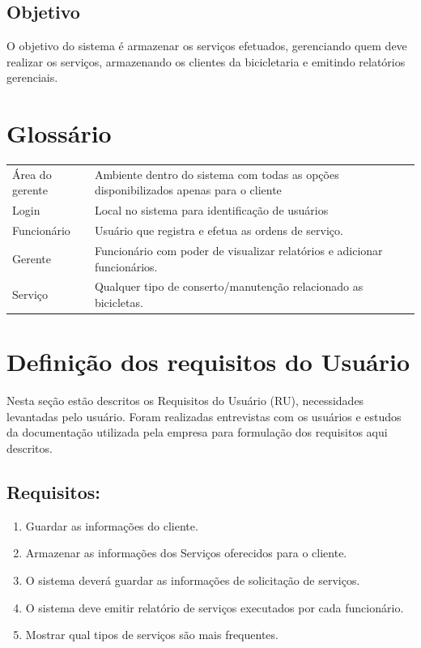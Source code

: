\documentclass[
	12pt,				%
	openright,
	oneside,			%
	a4paper,			%
	chapter=TITLE,		%
	brazil				%
	]{abntex2}
\begin{document}
\section{Objetivo}

O objetivo do sistema é armazenar os serviços efetuados, gerenciando quem deve realizar os serviços, armazenando os clientes da bicicletaria e emitindo relatórios gerenciais.

\newpage
\chapter{Glossário}

\begin{flushleft}
\begin{tabular}{ p{3cm} p{12cm} }
  Área do gerente  & Ambiente dentro do sistema com todas as opções disponibilizados apenas para o cliente\\
  Login				& Local no sistema para identificação de usuários 								\\
  Funcionário 		& Usuário que registra e efetua as ordens de serviço.				 			\\
  Gerente 			& Funcionário com poder de visualizar relatórios e adicionar funcionários.	\\
  Serviço 			& Qualquer tipo de conserto/manutenção relacionado as bicicletas. 			\\


\end{tabular}
\end{flushleft}




\chapter{Definição dos requisitos do Usuário}

Nesta seção estão descritos os Requisitos do Usuário (RU), necessidades levantadas pelo usuário. Foram realizadas entrevistas com os usuários e estudos da documentação utilizada pela empresa para formulação dos requisitos aqui descritos. 

\section{Requisitos:}

\begin{enumerate}[label=\bfseries RU\arabic*]
	\item Guardar as informações do cliente.
	\item Armazenar as informações dos Serviços oferecidos para o cliente.
	\item O sistema deverá guardar as informações de solicitação de serviços.
	\item O sistema deve emitir relatório de serviços executados por cada funcionário.
	\item Mostrar qual tipos de serviços são mais frequentes.
\end{enumerate}
\end{document}
